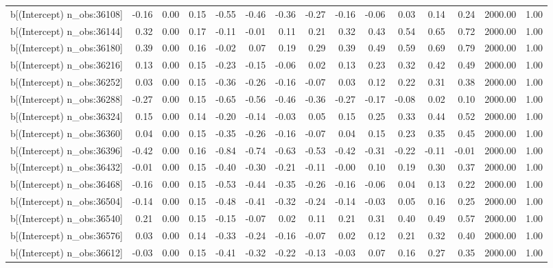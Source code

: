 \begin{table}[ht]
\begin{tabular}{rrrrrrrrrrrrrrr}
  b[(Intercept) n\_obs:36108] & -0.16 & 0.00 & 0.15 & -0.55 & -0.46 & -0.36 & -0.27 & -0.16 & -0.06 & 0.03 & 0.14 & 0.24 & 2000.00 & 1.00 \\ 
  b[(Intercept) n\_obs:36144] & 0.32 & 0.00 & 0.17 & -0.11 & -0.01 & 0.11 & 0.21 & 0.32 & 0.43 & 0.54 & 0.65 & 0.72 & 2000.00 & 1.00 \\ 
  b[(Intercept) n\_obs:36180] & 0.39 & 0.00 & 0.16 & -0.02 & 0.07 & 0.19 & 0.29 & 0.39 & 0.49 & 0.59 & 0.69 & 0.79 & 2000.00 & 1.00 \\ 
  b[(Intercept) n\_obs:36216] & 0.13 & 0.00 & 0.15 & -0.23 & -0.15 & -0.06 & 0.02 & 0.13 & 0.23 & 0.32 & 0.42 & 0.49 & 2000.00 & 1.00 \\ 
  b[(Intercept) n\_obs:36252] & 0.03 & 0.00 & 0.15 & -0.36 & -0.26 & -0.16 & -0.07 & 0.03 & 0.12 & 0.22 & 0.31 & 0.38 & 2000.00 & 1.00 \\ 
  b[(Intercept) n\_obs:36288] & -0.27 & 0.00 & 0.15 & -0.65 & -0.56 & -0.46 & -0.36 & -0.27 & -0.17 & -0.08 & 0.02 & 0.10 & 2000.00 & 1.00 \\ 
  b[(Intercept) n\_obs:36324] & 0.15 & 0.00 & 0.14 & -0.20 & -0.14 & -0.03 & 0.05 & 0.15 & 0.25 & 0.33 & 0.44 & 0.52 & 2000.00 & 1.00 \\ 
  b[(Intercept) n\_obs:36360] & 0.04 & 0.00 & 0.15 & -0.35 & -0.26 & -0.16 & -0.07 & 0.04 & 0.15 & 0.23 & 0.35 & 0.45 & 2000.00 & 1.00 \\ 
  b[(Intercept) n\_obs:36396] & -0.42 & 0.00 & 0.16 & -0.84 & -0.74 & -0.63 & -0.53 & -0.42 & -0.31 & -0.22 & -0.11 & -0.01 & 2000.00 & 1.00 \\ 
  b[(Intercept) n\_obs:36432] & -0.01 & 0.00 & 0.15 & -0.40 & -0.30 & -0.21 & -0.11 & -0.00 & 0.10 & 0.19 & 0.30 & 0.37 & 2000.00 & 1.00 \\ 
  b[(Intercept) n\_obs:36468] & -0.16 & 0.00 & 0.15 & -0.53 & -0.44 & -0.35 & -0.26 & -0.16 & -0.06 & 0.04 & 0.13 & 0.22 & 2000.00 & 1.00 \\ 
  b[(Intercept) n\_obs:36504] & -0.14 & 0.00 & 0.15 & -0.48 & -0.41 & -0.32 & -0.24 & -0.14 & -0.03 & 0.05 & 0.16 & 0.25 & 2000.00 & 1.00 \\ 
  b[(Intercept) n\_obs:36540] & 0.21 & 0.00 & 0.15 & -0.15 & -0.07 & 0.02 & 0.11 & 0.21 & 0.31 & 0.40 & 0.49 & 0.57 & 2000.00 & 1.00 \\ 
  b[(Intercept) n\_obs:36576] & 0.03 & 0.00 & 0.14 & -0.33 & -0.24 & -0.16 & -0.07 & 0.02 & 0.12 & 0.21 & 0.32 & 0.40 & 2000.00 & 1.00 \\ 
  b[(Intercept) n\_obs:36612] & -0.03 & 0.00 & 0.15 & -0.41 & -0.32 & -0.22 & -0.13 & -0.03 & 0.07 & 0.16 & 0.27 & 0.35 & 2000.00 & 1.00 \\ 

\end{tabular}
\end{table}
